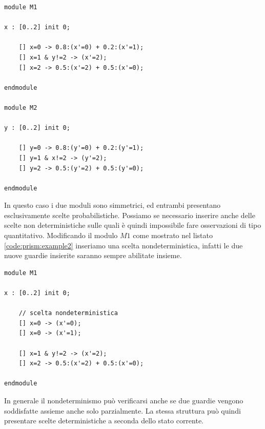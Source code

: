 \begin{lstlisting}[language=prism,style=eclipse,caption={Esempio di definizione dei moduli in \prism{}},label=code:prism:example1]
module M1

x : [0..2] init 0;

    [] x=0 -> 0.8:(x'=0) + 0.2:(x'=1);
    [] x=1 & y!=2 -> (x'=2);
    [] x=2 -> 0.5:(x'=2) + 0.5:(x'=0);

endmodule 

module M2

y : [0..2] init 0;

    [] y=0 -> 0.8:(y'=0) + 0.2:(y'=1);
    [] y=1 & x!=2 -> (y'=2);
    [] y=2 -> 0.5:(y'=2) + 0.5:(y'=0);

endmodule
\end{lstlisting}
In questo caso i due moduli sono simmetrici, ed entrambi presentano esclusivamente scelte probabilistiche. Possiamo se necessario inserire anche delle scelte non deterministiche sulle quali è quindi impossibile fare osservazioni di tipo quantitativo. Modificando il modulo $M1$ come mostrato nel listato \ref{code:prism:example2} inseriamo una scelta nondeterministica, infatti le due nuove guardie insierite saranno sempre abilitate insieme.
\begin{lstlisting}[language=prism,style=eclipse,caption={Scelta nondeterministica in \prism{}},label=code:prism:example2]
module M1

x : [0..2] init 0;

	// scelta nondeterministica
    [] x=0 -> (x'=0);
	[] x=0 -> (x'=1);
	
    [] x=1 & y!=2 -> (x'=2);
    [] x=2 -> 0.5:(x'=2) + 0.5:(x'=0);
	
endmodule
\end{lstlisting}
In generale il nondeterminismo può verificarsi anche se due guardie vengono soddisfatte assieme anche solo parzialmente. La stessa struttura può quindi presentare scelte deterministiche a seconda dello stato corrente.

